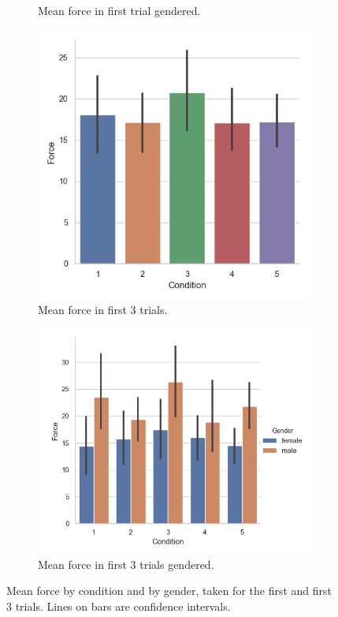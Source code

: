 \begin{figure}[H]
\begin{subfigure}[b]{0.5\textwidth}
     \caption{Mean force in first trial gendered.}
     \label{fig:fig:meanF1stGen}
 \end{subfigure}
  \begin{subfigure}[b]{0.5\textwidth}
     \centering
     \includegraphics[scale=0.5]{Files/Plots/force_first_3.png}
     \caption{Mean force in first 3 trials.}
     \label{fig:fig:meanF3rd}
 \end{subfigure}
     \begin{subfigure}[b]{0.5\textwidth}
     \centering
     \includegraphics[scale=0.5]{Files/Plots/force_first_3_gen.png}
     \caption{Mean force in first 3 trials gendered.}
     \label{fig:fig:meanF3rdGen}
 \end{subfigure}
     \caption{Mean force by condition and by gender, taken for the first and first 3 trials. Lines on bars are confidence intervals.}
    \label{fig:forceIn1st3rd}
\end{figure}

